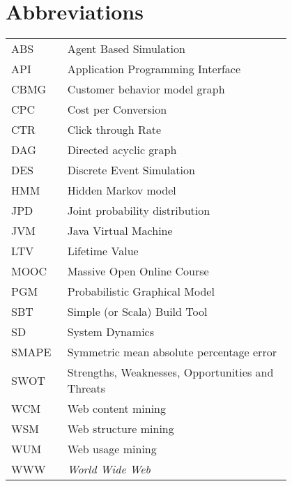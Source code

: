 \chapter*{Abbreviations}

\begin{flushleft}
\begin{tabular}{l p{0.8\linewidth}}
ABS      & Agent Based Simulation\\
API      & Application Programming Interface\\
CBMG     & Customer behavior model graph\\
CPC      & Cost per Conversion\\
CTR      & Click through Rate\\
DAG      & Directed acyclic graph\\
DES      & Discrete Event Simulation\\
HMM      & Hidden Markov model\\
JPD      & Joint probability distribution\\
JVM      & Java Virtual Machine\\
LTV      & Lifetime Value\\
MOOC     & Massive Open Online Course\\
PGM      & Probabilistic Graphical Model\\
SBT      & Simple (or Scala) Build Tool\\
SD       & System Dynamics\\
SMAPE    & Symmetric mean absolute percentage error\\
SWOT     & Strengths, Weaknesses, Opportunities and Threats\\
WCM      & Web content mining\\
WSM      & Web structure mining\\
WUM      & Web usage mining\\
WWW      & \emph{World Wide Web}
\end{tabular}
\end{flushleft}
